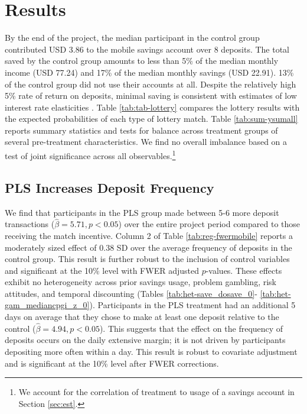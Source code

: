 \documentclass[11pt]{article}
\begin{document}
\section{Results} \label{sec:results}

	By the end of the project, the median participant in the control group contributed USD 3.86 to the mobile savings account over 8 deposits. The total saved by the control group amounts to less than 5\% of the median monthly income (USD 77.24) and 17\% of the median monthly savings (USD 22.91). 13\% of the control group did not use their accounts at all. Despite the relatively high 5\% rate of return on deposits, minimal saving is consistent with estimates of low interest rate elasticities \parencite{karlan_price_2018}. Table \ref{tab:tab-lottery} compares the lottery results with the expected probabilities of each type of lottery match. Table \ref{tab:sum-ysumall} reports summary statistics and tests for balance across treatment groups of several pre-treatment characteristics. We find no overall imbalance based on a test of joint significance across all observables.\footnote{We account for the correlation of treatment to usage of a savings account in Section \ref{sec:est}.}

	

	

	\subsection{PLS Increases Deposit Frequency}

		We find that participants in the PLS group made between 5-6 more deposit transactions ($\hat \beta = 5.71, p < 0.05$) over the entire project period compared to those receiving the match incentive. Column 2 of Table \ref{tab:reg-fwermobile} reports a moderately sized effect of 0.38 SD over the average frequency of deposits in the control group. This result is further robust to the inclusion of control variables and significant at the 10\% level with FWER adjusted $p$-values. These effects exhibit no heterogeneity across prior savings usage, problem gambling, risk attitudes, and temporal discounting (Tables \ref{tab:het-save_dosave_0}- \ref{tab:het-gam_mediancpgi_z_0}). Participants in the PLS treatment had an additional 5 days on average that they chose to make at least one deposit relative to the control ($\hat \beta = 4.94, p < 0.05$). This suggests that the effect on the frequency of deposits occurs on the daily extensive margin; it is not driven by participants depositing more often within a day. This result is robust to covariate adjustment and is significant at the 10\% level after FWER corrections.
\end{document}
